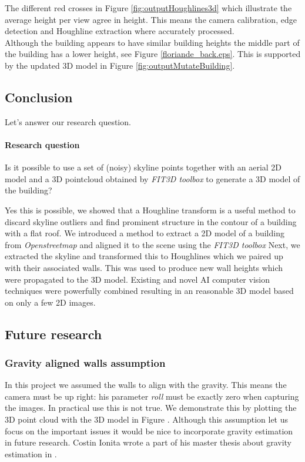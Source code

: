 The different red crosses in Figure \ref{fig:outputHoughlines3d} which illustrate the average height per view 
agree in height. This means the camera calibration, edge detection and Houghline
extraction where accurately processed. \\

Although the building appears to have similar building heights the middle part
of the building has a lower height, see Figure \ref{floriande_back.eps}.
This is supported by the updated 3D model in Figure
\ref{fig:outputMutateBuilding}.




\subsection{Conclusion}
Let's answer our research question.
\paragraph{Research question}
Is it possible to use a set of (noisy) skyline points together with an aerial
2D model and a 3D pointcloud obtained by \emph{FIT3D toolbox\cite{FIT3D}} to generate a 3D model of the building?

Yes this is possible, we showed that a Houghline transform is a useful method to
discard skyline outliers and find prominent structure in the contour of a
building with a flat roof. We introduced a method to extract a 2D model of a
building from \emph{Openstreetmap\cite{Openstreetmap}} and aligned it to the
scene using the \emph{FIT3D toolbox\cite{FIT3D}} Next, we extracted the skyline
and transformed this to Houghlines which we paired up with their associated
walls. This was used to produce new wall heights which were propagated to the 3D
model.  Existing and novel AI computer vision techniques were powerfully
combined resulting in an reasonable 3D model based on only a few 2D images. 

\subsection{Future research}
\subsubsection{Gravity aligned walls assumption}
In this project we assumed the walls to align with the gravity.
This means the camera must be up right: his parameter \emph{roll} must be
exactly zero when capturing the images. 
In practical use this is not true. We demonstrate this by plotting the 3D point cloud
with the 3D model in Figure .
Although this assumption let us focus on the important issues it would be nice
to incorporate gravity estimation in future research.
Costin Ionita wrote a part of his master thesis about gravity estimation in
\cite{costin}.\\

